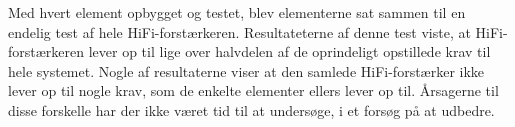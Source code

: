 Med hvert element opbygget og testet, blev elementerne sat sammen til en endelig test af hele HiFi-forstærkeren. Resultateterne af denne test viste, at HiFi-forstærkeren lever op til lige over halvdelen af de oprindeligt opstillede krav til hele systemet. Nogle af resultaterne viser at den samlede HiFi-forstærker ikke lever op til nogle krav, som de enkelte elementer ellers lever op til. Årsagerne til disse forskelle har der ikke været tid til at undersøge, i et forsøg på at udbedre.

